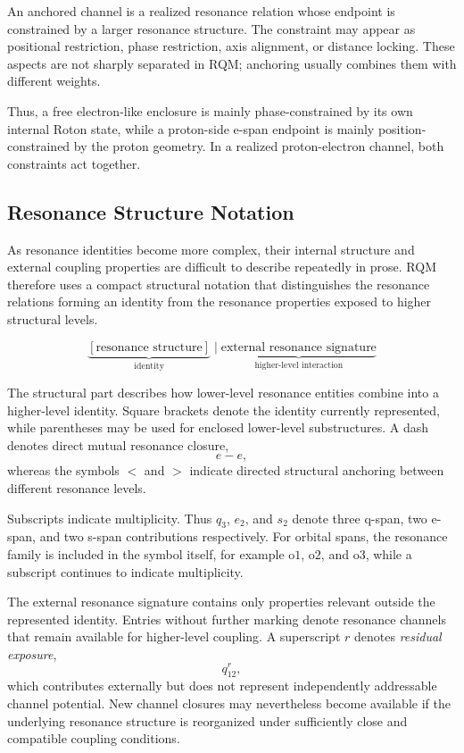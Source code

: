 \documentclass[11pt,a4paper]{article}
\begin{document}
An anchored channel is a realized resonance relation whose endpoint is constrained by a larger resonance structure. The constraint may appear as positional restriction, phase restriction, axis alignment, or distance locking. These aspects are not sharply separated in RQM; anchoring usually combines them with different weights.

Thus, a free electron-like enclosure is mainly phase-constrained by its own internal Roton state, while a proton-side e-span endpoint is mainly position-constrained by the proton geometry. In a realized proton-electron channel, both constraints act together.


\subsection{Resonance Structure Notation}

As resonance identities become more complex, their internal structure and external coupling properties are difficult to describe repeatedly in prose. RQM therefore uses a compact structural notation that distinguishes the resonance relations forming an identity from the resonance properties exposed to higher structural levels.

\[
\boxed{
\underbrace{[\text{resonance structure}]}_{\text{identity}}
\;\Big|\;
\underbrace{\text{external resonance signature}}_{\text{higher-level interaction}}
}
\]

The structural part describes how lower-level resonance entities combine into a higher-level identity. Square brackets denote the identity currently represented, while parentheses may be used for enclosed lower-level substructures. A dash denotes direct mutual resonance closure,
\[
e-e,
\]
whereas the symbols \(<\) and \(>\) indicate directed structural anchoring between different resonance levels.

Subscripts indicate multiplicity. Thus \(q_3\), \(e_2\), and \(s_2\) denote three q-span, two e-span, and two s-span contributions respectively. For orbital spans, the resonance family is included in the symbol itself, for example \(\mathrm{o1}\), \(\mathrm{o2}\), and \(\mathrm{o3}\), while a subscript continues to indicate multiplicity.

The external resonance signature contains only properties relevant outside the represented identity. Entries without further marking denote resonance channels that remain available for higher-level coupling. A superscript \(r\) denotes \emph{residual exposure},
\[
q_{12}^{r},
\]
which contributes externally but does not represent independently addressable channel potential. New channel closures may nevertheless become available if the underlying resonance structure is reorganized under sufficiently close and compatible coupling conditions.
\end{document}
